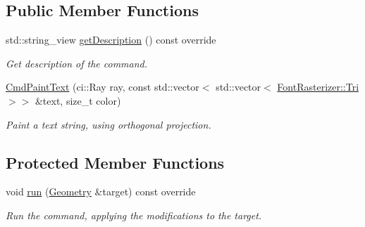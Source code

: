 \subsection*{Public Member Functions}
\begin{DoxyCompactItemize}
\item 
\mbox{\label{classpepr3d_1_1_cmd_paint_text_a6f0151b7a51789642343678ba7b37b28}} 
std\+::string\+\_\+view \mbox{\hyperlink{classpepr3d_1_1_cmd_paint_text_a6f0151b7a51789642343678ba7b37b28}{get\+Description}} () const override
\begin{DoxyCompactList}\small\item\em Get description of the command. \end{DoxyCompactList}\item 
\mbox{\hyperlink{classpepr3d_1_1_cmd_paint_text_aab856aaa010955874c11426257d20627}{Cmd\+Paint\+Text}} (ci\+::\+Ray ray, const std\+::vector$<$ std\+::vector$<$ \mbox{\hyperlink{structpepr3d_1_1_font_rasterizer_1_1_tri}{Font\+Rasterizer\+::\+Tri}} $>$$>$ \&text, size\+\_\+t color)
\begin{DoxyCompactList}\small\item\em Paint a text string, using orthogonal projection. \end{DoxyCompactList}\end{DoxyCompactItemize}
\subsection*{Protected Member Functions}
\begin{DoxyCompactItemize}
\item 
\mbox{\label{classpepr3d_1_1_cmd_paint_text_a0d2c68846f62a633e4a83d33f4dd3d86}} 
void \mbox{\hyperlink{classpepr3d_1_1_cmd_paint_text_a0d2c68846f62a633e4a83d33f4dd3d86}{run}} (\mbox{\hyperlink{classpepr3d_1_1_geometry}{Geometry}} \&target) const override
\begin{DoxyCompactList}\small\item\em Run the command, applying the modifications to the target. \end{DoxyCompactList}\end{DoxyCompactItemize}
